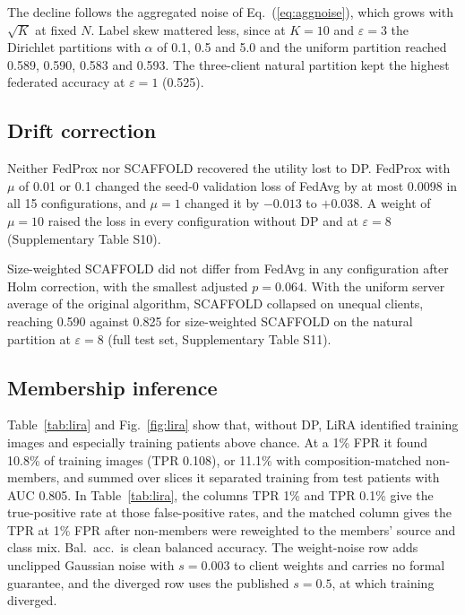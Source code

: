 \documentclass[preprint,12pt]{elsarticle}
\begin{document}
The decline follows the aggregated noise of Eq.~(\ref{eq:aggnoise}), which grows with $\sqrt{K}$ at fixed $N$. Label
skew mattered less, since at $K=10$ and $\varepsilon=3$ the Dirichlet partitions with $\alpha$ of 0.1, 0.5 and 5.0 and
the uniform partition reached 0.589, 0.590, 0.583 and 0.593. The three-client natural partition kept the highest
federated accuracy at $\varepsilon=1$ (0.525).

\subsection{Drift correction}
Neither FedProx nor SCAFFOLD recovered the utility lost to DP. FedProx with $\mu$ of 0.01 or 0.1 changed the seed-0
validation loss of FedAvg by at most 0.0098 in all 15 configurations, and $\mu=1$ changed it by $-0.013$ to
$+0.038$. A weight of $\mu=10$ raised the loss in every configuration without DP and at $\varepsilon=8$
(Supplementary Table S10).

Size-weighted SCAFFOLD did not differ from FedAvg in any configuration after Holm correction, with the smallest adjusted
$p=0.064$. With the uniform server average of the original algorithm, SCAFFOLD collapsed on unequal clients, reaching
0.590 against 0.825 for size-weighted SCAFFOLD on the natural partition at $\varepsilon=8$ (full test set,
Supplementary Table S11).

\subsection{Membership inference}
Table~\ref{tab:lira} and Fig.~\ref{fig:lira} show that, without DP, LiRA identified training images and especially
training patients above chance. At a 1\% FPR it found 10.8\% of training images (TPR 0.108), or 11.1\% with
composition-matched non-members, and summed over slices it separated training from test patients with AUC 0.805.
In Table~\ref{tab:lira}, the columns TPR 1\% and TPR 0.1\% give the true-positive rate at those false-positive rates,
and the matched column gives the TPR at 1\% FPR after non-members were reweighted to the members' source and class mix.
Bal.\ acc.\ is clean balanced accuracy. The weight-noise row adds unclipped Gaussian noise with $s=0.003$ to client
weights and carries no formal guarantee, and the diverged row uses the published $s=0.5$, at which training diverged.
\end{document}
